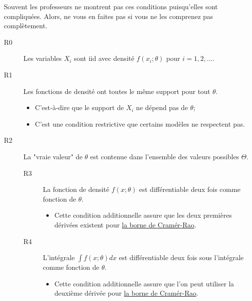 \documentclass[10pt, french]{article}
\begin{document}
\begin{multicols*}{2}
Souvent les professeurs ne montrent pas ces conditions puisqu'elles sont compliquées. Alors, ne vous en faites pas si vous ne les comprenez pas complètement.

\begin{definitionNOHFILLsub}
\begin{description}
	\item[R0]	Les variables $X_{i}$ sont iid avec densité $f(x_{i}; \theta)$ pour $i	=	1, 2, \dots$.
	\item[R1]	Les fonctions de densité ont toutes le même support pour tout $\theta$.
		\begin{itemize}
		\item	C'est-à-dire que le support de $X_{i}$ ne dépend pas de $\theta$;
		\item	C'est une condition restrictive que certains modèles ne respectent pas.
		\end{itemize}
	\item[R2]	La "vraie valeur" de $\theta$ est contenue dans l'ensemble des valeurs possibles $\Theta$.
\tcbline
\begin{description}
	\item[R3]	La fonction de densité $f(x; \theta)$ est différentiable deux fois comme fonction de $\theta$.
		\begin{itemize}
		\item	Cette condition additionnelle assure que les deux premières dérivées existent pour \hyperref[sec:cramer_rao]{\color{azure(colorwheel)}la borne de Cramér-Rao}.
		\end{itemize}
	\item[R4]	L'intégrale $\int f(x; \theta) dx$ est différentiable deux fois sous l'intégrale comme fonction de $\theta$.
		\begin{itemize}
		\item	Cette condition additionnelle assure que l'on peut utiliser la deuxième dérivée pour \hyperref[sec:cramer_rao]{\color{azure(colorwheel)}la borne de Cramér-Rao}.
		\end{itemize}
\end{description}
\end{description}
\end{definitionNOHFILLsub}
	


\end{multicols*}
\end{document}
